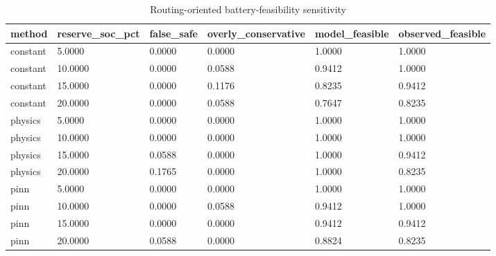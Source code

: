 \begin{table}[t]
\centering
\caption{Routing-oriented battery-feasibility sensitivity}
\label{tab:feas}
\begin{tabular}{llllll}
\hline
method & reserve\_soc\_pct & false\_safe & overly\_conservative & model\_feasible & observed\_feasible \\
\hline
constant & 5.0000 & 0.0000 & 0.0000 & 1.0000 & 1.0000 \\
constant & 10.0000 & 0.0000 & 0.0588 & 0.9412 & 1.0000 \\
constant & 15.0000 & 0.0000 & 0.1176 & 0.8235 & 0.9412 \\
constant & 20.0000 & 0.0000 & 0.0588 & 0.7647 & 0.8235 \\
physics & 5.0000 & 0.0000 & 0.0000 & 1.0000 & 1.0000 \\
physics & 10.0000 & 0.0000 & 0.0000 & 1.0000 & 1.0000 \\
physics & 15.0000 & 0.0588 & 0.0000 & 1.0000 & 0.9412 \\
physics & 20.0000 & 0.1765 & 0.0000 & 1.0000 & 0.8235 \\
pinn & 5.0000 & 0.0000 & 0.0000 & 1.0000 & 1.0000 \\
pinn & 10.0000 & 0.0000 & 0.0588 & 0.9412 & 1.0000 \\
pinn & 15.0000 & 0.0000 & 0.0000 & 0.9412 & 0.9412 \\
pinn & 20.0000 & 0.0588 & 0.0000 & 0.8824 & 0.8235 \\
\hline
\end{tabular}
\end{table}
